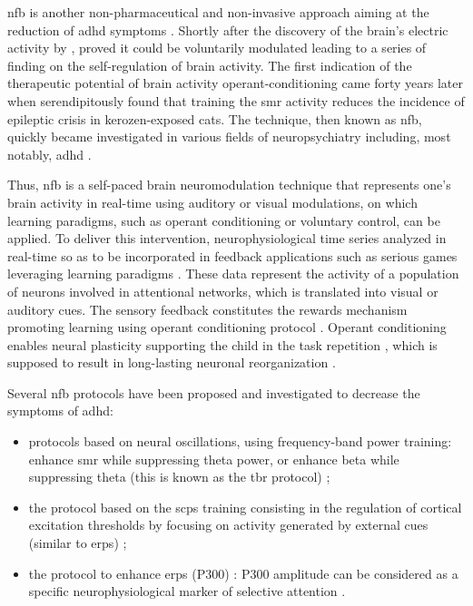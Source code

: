 \gls{nfb} is another non-pharmaceutical and non-invasive approach aiming at the reduction of \gls{adhd} symptoms 
\citep{Arns2015, Steffert2010, Marzbani2016}. Shortly after the discovery of the brain's electric activity by 
\citet{Berger1929}, \citet{Durup1935} proved it could be voluntarily modulated leading to a series of finding on the 
self-regulation of brain activity. The first indication of the therapeutic potential of brain activity operant-conditioning 
came forty years later when \citet{Sterman1974} serendipitously found that training the \gls{smr} activity reduces the incidence 
of epileptic crisis in kerozen-exposed cats. The technique, then known as \gls{nfb}, quickly became investigated in various 
fields of neuropsychiatry including, most notably, \gls{adhd} \citep{Lubar1976, Rossiter1995, Linden1996, Maurizio2014}.

Thus, \gls{nfb} is a self-paced brain neuromodulation technique that represents one's brain activity in real-time using auditory 
or visual modulations, on which learning paradigms, such as operant conditioning
\citep{Reynolds1975} or voluntary control, can be applied. To deliver this intervention, neurophysiological time series 
analyzed in real-time so as to be incorporated in feedback applications such as serious games leveraging learning paradigms \citep{Wang2010}. 
These data represent the activity of a population of neurons involved in attentional networks, which is translated into 
visual or auditory cues. The sensory feedback constitutes the rewards mechanism promoting learning using operant conditioning 
protocol \citep{Sherlin2011}. Operant conditioning enables neural plasticity supporting the child in the task repetition \citep{Skinner1961}, 
which is supposed to result in long-lasting neuronal reorganization \citep{VanDoren2017}. 

Several \gls{nfb} protocols have been proposed and investigated to decrease the symptoms of \gls{adhd}:
\begin{itemize} 
  \item protocols based on neural oscillations, using frequency-band power training: enhance \gls{smr} while
    suppressing theta power, or enhance beta while suppressing theta (this is known as
    the \gls{tbr} protocol) \citep{Lubar1976, Arns2013}; 
  \item the protocol based on the \glspl{scp} training consisting in the regulation of
    cortical excitation thresholds by focusing on activity generated by external cues (similar to \glspl{erp})
    \citep{Heinrich2004, Banaschewski2007}; 
  \item the protocol to enhance \glspl{erp} (P300) \citep{Fouillen2017}: P300 amplitude can be considered as a specific
    neurophysiological marker of selective attention \citep{RolandLeBouedec}.  
\end{itemize} 

